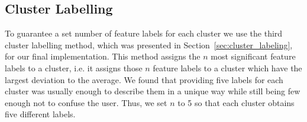 \subsection{Cluster Labelling}
\label{sec:impl_cluster_labeling}

To guarantee a set number of feature labels for each cluster we use the third cluster labelling method, which was presented in Section~\ref{sec:cluster_labeling}, for our final implementation.
This method assigns the $n$ most significant feature labels to a cluster, i.e. it assigns those $n$ feature labels to a cluster which have the largest deviation to the average.
We found that providing five labels for each cluster was usually enough to describe them in a unique way while still being few enough not to confuse the user.
Thus, we set $n$ to 5 so that each cluster obtains five different labels.

